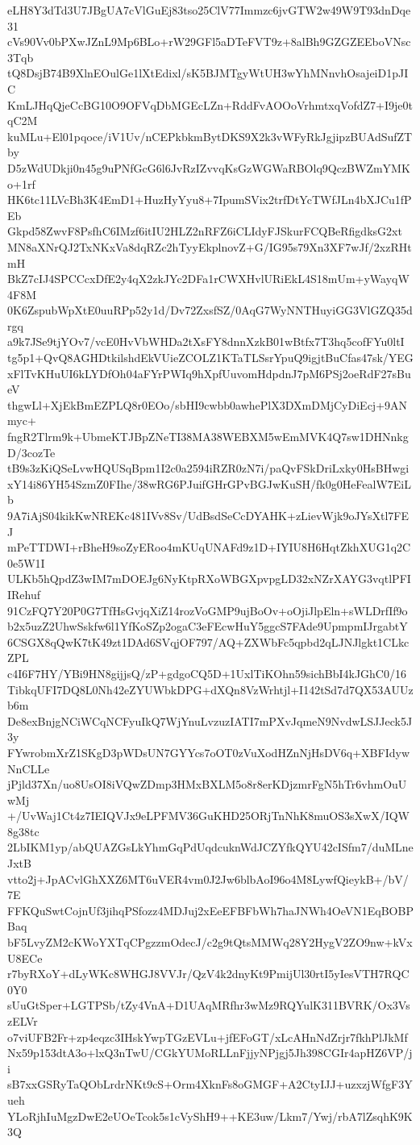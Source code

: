 eLH8Y3dTd3U7JBgUA7cVlGuEj83tso25ClV77Immzc6jvGTW2w49W9T93dnDqe31
cVs90Vv0bPXwJZnL9Mp6BLo+rW29GFl5aDTeFVT9z+8alBh9GZGZEEboVNsc3Tqb
tQ8DsjB74B9XlnEOulGe1lXtEdixl/sK5BJMTgyWtUH3wYhMNnvhOsajeiD1pJIC
KmLJHqQjeCcBG10O9OFVqDbMGEcLZn+RddFvAOOoVrhmtxqVofdZ7+I9je0tqC2M
kuMLu+El01pqoce/iV1Uv/nCEPkbkmBytDKS9X2k3vWFyRkJgjipzBUAdSufZTby
D5zWdUDkji0n45g9uPNfGcG6l6JvRzIZvvqKsGzWGWaRBOlq9QczBWZmYMKo+1rf
HK6tc11LVcBh3K4EmD1+HuzHyYyu8+7IpumSVix2trfDtYcTWfJLn4bXJCu1fPEb
Gkpd58ZwvF8PsfhC6IMzf6itIU2HLZ2nRFZ6iCLIdyFJSkurFCQBeRfigdksG2xt
MN8aXNrQJ2TxNKxVa8dqRZc2hTyyEkplnovZ+G/IG95s79Xn3XF7wJf/2xzRHtmH
BkZ7cIJ4SPCCcxDfE2y4qX2zkJYc2DFa1rCWXHvlURiEkL4S18mUm+yWayqW4F8M
0K6ZspubWpXtE0uuRPp52y1d/Dv72ZxsfSZ/0AqG7WyNNTHuyiGG3VlGZQ35drgq
a9k7JSe9tjYOv7/vcE0HvVbWHDa2tXsFY8dnnXzkB01wBtfx7T3hq5cofFYu0ltI
tg5p1+QvQ8AGHDtkilshdEkVUieZCOLZ1KTaTLSsrYpuQ9igjtBuCfas47sk/YEG
xFlTvKHuUI6kLYDfOh04aFYrPWIq9hXpfUuvomHdpdnJ7pM6PSj2oeRdF27sBueV
thgwLl+XjEkBmEZPLQ8r0EOo/sbHI9cwbb0awhePlX3DXmDMjCyDiEcj+9ANmyc+
fngR2Tlrm9k+UbmeKTJBpZNeTI38MA38WEBXM5wEmMVK4Q7sw1DHNnkgD/3cozTe
tB9s3zKiQSeLvwHQUSqBpm1I2c0a2594iRZR0zN7i/paQvFSkDriLxky0HsBHwgi
xY14i86YH54SzmZ0FIhe/38wRG6PJuifGHrGPvBGJwKuSH/fk0g0HeFealW7EiLb
9A7iAjS04kikKwNREKc481IVv8Sv/UdBsdSeCcDYAHK+zLievWjk9oJYsXtl7FEJ
mPeTTDWI+rBheH9soZyERoo4mKUqUNAFd9z1D+IYIU8H6HqtZkhXUG1q2C0e5W1I
ULKb5hQpdZ3wIM7mDOEJg6NyKtpRXoWBGXpvpgLD32xNZrXAYG3vqtlPFIIRehuf
91CzFQ7Y20P0G7TfHsGvjqXiZ14rozVoGMP9ujBoOv+oOjiJlpEln+sWLDrfIf9o
b2x5uzZ2UhwSskfw6l1YfKoSZp2ogaC3eFEcwHuY5ggcS7FAde9UpmpmIJrgabtY
6CSGX8qQwK7tK49zt1DAd6SVqjOF797/AQ+ZXWbFc5qpbd2qLJNJlgkt1CLkcZPL
c4I6F7HY/YBi9HN8gijjsQ/zP+gdgoCQ5D+1UxlTiKOhn59sichBbI4kJGhC0/16
TibkqUFI7DQ8L0Nh42eZYUWbkDPG+dXQn8VzWrhtjl+I142tSd7d7QX53AUUzb6m
De8exBnjgNCiWCqNCFyuIkQ7WjYnuLvzuzIATI7mPXvJqmeN9NvdwLSJJeck5J3y
FYwrobmXrZ1SKgD3pWDsUN7GYYcs7oOT0zVuXodHZnNjHsDV6q+XBFIdywNnCLLe
jPjld37Xn/uo8UsOI8iVQwZDmp3HMxBXLM5o8r8erKDjzmrFgN5hTr6vhmOuUwMj
+/UvWaj1Ct4z7IEIQVJx9eLPFMV36GuKHD25ORjTnNhK8muOS3sXwX/IQW8g38tc
2LbIKM1yp/abQUAZGsLkYhmGqPdUqdcuknWdJCZYfkQYU42cISfm7/duMLneJxtB
vtto2j+JpACvlGhXXZ6MT6uVER4vm0J2Jw6blbAoI96o4M8LywfQieykB+/bV/7E
FFKQuSwtCojnUf3jihqPSfozz4MDJuj2xEeEFBFbWh7haJNWh4OeVN1EqBOBPBaq
bF5LvyZM2cKWoYXTqCPgzzmOdecJ/c2g9tQtsMMWq28Y2HygV2ZO9nw+kVxU8ECe
r7byRXoY+dLyWKc8WHGJ8VVJr/QzV4k2dnyKt9PmijUl30rtI5yIesVTH7RQC0Y0
sUuGtSper+LGTPSb/tZy4VnA+D1UAqMRfhr3wMz9RQYulK311BVRK/Ox3VszELVr
o7viUFB2Fr+zp4eqzc3IHskYwpTGzEVLu+jfEFoGT/xLcAHnNdZrjr7fkhPlJkMf
Nx59p153dtA3o+lxQ3nTwU/CGkYUMoRLLnFjjyNPjgj5Jh398CGIr4apHZ6VP/ji
sB7xxGSRyTaQObLrdrNKt9cS+Orm4XknFs8oGMGF+A2CtyIJJ+uzxzjWfgF3Yueh
YLoRjhIuMgzDwE2eUOeTcok5s1cVyShH9++KE3uw/Lkm7/Ywj/rbA7lZsqhK9K3Q
